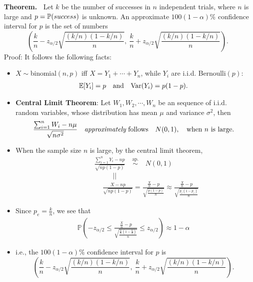 \begin{frame}

{\bf Theorem.~} Let $k$ be the number of successes in $n$ independent trials, where $n$ is large and
$p = \mathbb{P}(success)$ is unknown. An approximate $100(1-\alpha)\%$ confidence interval for $p$ is
the set of numbers
 \[
 \left(\frac{k}{n}-z_{\alpha/2} \sqrt{\frac{(k/n)(1-k/n)}{n}},\:\frac{k}{n}+z_{\alpha/2} \sqrt{\frac{(k/n)(1-k/n)}{n}}\right).
 \]
\pause
\vfill
Proof: It follows the following facts:
\begin{itemize}
  \item $X\sim$binomial$(n,p)$ iff $X=Y_1+\cdots+Y_n$, while $Y_i$ are i.i.d. Bernoulli$(p)$:
  \begin{align*}
    \mathbb{E}[Y_i] = p\quad\text{and}\quad \text{Var}(Y_i)=p(1-p).
  \end{align*}
  \item {\bf Central Limit Theorem}: Let $W_1, W_2,\cdots, W_n$ be an sequence of i.i.d. random variables, whose distribution has mean $\mu$ and variance  $\sigma^2$, then
    \begin{align*}
      \frac{\sum_{i=1}^n W_i - n\mu}{\sqrt{n\sigma^2 }} \quad \text{{\it approximately} follows}\quad N(0,1),\quad \text{when $n$ is large.}
    \end{align*}
\end{itemize}
\end{frame}
\begin{frame}[fragile]
\begin{itemize}
  \item When the sample size $n$ is large, by the central limit theorem,
    \begin{align*}
      \frac{\sum_{i=1}^n Y_i - np}{\sqrt{np(1-p)}}
      \quad \stackrel{\text{ap.}}{\sim}\quad  N(0,1)
    \end{align*}
    \pause
    \[||\hspace{5em}\phantom{a}\]
    \vspace{-1em}
    \begin{align*}
      \hspace{5em}
      \frac{X - np}{\sqrt{np(1-p)}} =
      \frac{\frac{X}{n} - p}{\sqrt{\frac{p(1-p)}{n} }} \approx
      \frac{\frac{X}{n} - p}{\sqrt{\frac{p_e(1-p_e)}{n} }}
    \end{align*}
    \pause
  \item Since $p_e=\frac{k}{n}$, we see that
  \begin{align*}
    \mathbb{P}\left(-z_{\alpha/2} \le \frac{\frac{X}{n} - p}{\sqrt{\frac{\frac{k}{n}\left(1-\frac{k}{n}\right)}{n} }} \le z_{\alpha/2} \right) \approx 1-\alpha
  \end{align*}
  \item[] i.e., the $100(1-\alpha)\%$ confidence interval for $p$ is
 \[
 \left(\frac{k}{n}-z_{\alpha/2} \sqrt{\frac{(k/n)(1-k/n)}{n}},\:\frac{k}{n}+z_{\alpha/2} \sqrt{\frac{(k/n)(1-k/n)}{n}}\right).
 \]
 \myEnd
\end{itemize}
\end{frame}
